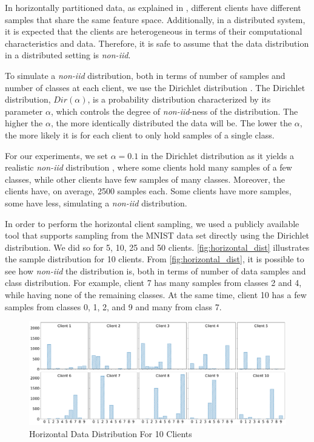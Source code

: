 In horizontally partitioned data, as explained in , different clients have different samples that share the same feature space. Additionally, in a distributed system, it is expected that the clients are heterogeneous in terms of their computational characteristics and data. Therefore, it is safe to assume that the data distribution in a distributed setting is \textit{non-iid}.

To simulate a \textit{non-iid} distribution, both in terms of number of samples and number of classes at each client, we use the Dirichlet distribution \cite{tim, 10.48550/arxiv.2006.07242}. The Dirichlet distribution, $Dir(\alpha)$, is a probability distribution characterized by its parameter $\alpha$, which controls the degree of \textit{non-iid}-ness of the distribution. The higher the $\alpha$, the more identically distributed the data will be. The lower the $\alpha$, the more likely it is for each client to only hold samples of a single class.

For our experiments, we set $\alpha = 0.1$ in the Dirichlet distribution as it yields a realistic \textit{non-iid} distribution \cite{10.48550/arxiv.2006.07242}, where some clients hold many samples of a few classes, while other clients have few samples of many classes. Moreover, the clients have, on average, 2500 samples each. Some clients have more samples, some have less, simulating a \textit{non-iid} distribution.

In order to perform the horizontal client sampling, we used a publicly available tool \cite{tsingz0} that supports sampling from the MNIST data set directly using the Dirichlet distribution. We did so for 5, 10, 25 and 50 clients. \autoref{fig:horizontal_dist} illustrates the sample distribution for 10 clients. From \autoref{fig:horizontal_dist}, it is possible to see how \textit{non-iid} the distribution is, both in terms of number of data samples and class distribution. For example, client 7 has many samples from classes 2 and 4, while having none of the remaining classes. At the same time, client 10 has a few samples from classes 0, 1, 2, and 9 and many from class 7.

\begin{figure}[!ht]
    \centering
    \centering
    \includegraphics[width=1\textwidth]{graphics/10_dist.pdf}
    \caption{Horizontal Data Distribution For 10 Clients}
    \label{fig:horizontal_dist}
\end{figure}

